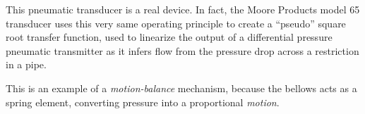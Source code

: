 \vskip 10pt

This pneumatic transducer is a real device.  In fact, the Moore Products model 65 transducer uses this very same operating principle to create a ``pseudo'' square root transfer function, used to linearize the output of a differential pressure pneumatic transmitter as it infers flow from the pressure drop across a restriction in a pipe.

This is an example of a {\it motion-balance} mechanism, because the bellows acts as a spring element, converting pressure into a proportional {\it motion}.












